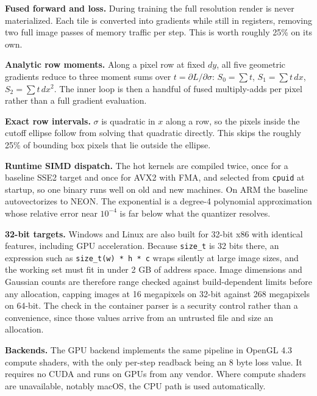\documentclass[11pt,a4paper]{article}
\begin{document}
\textbf{Fused forward and loss.} During training the full resolution render is never materialized. Each tile is converted into gradients while still in registers, removing two full image passes of memory traffic per step. This is worth roughly 25\% on its own.

\textbf{Analytic row moments.} Along a pixel row at fixed $dy$, all five geometric gradients reduce to three moment sums over $t = \partial L / \partial \sigma$: $S_0 = \sum t$, $S_1 = \sum t\,dx$, $S_2 = \sum t\,dx^2$. The inner loop is then a handful of fused multiply-adds per pixel rather than a full gradient evaluation.

\textbf{Exact row intervals.} $\sigma$ is quadratic in $x$ along a row, so the pixels inside the cutoff ellipse follow from solving that quadratic directly. This skips the roughly 25\% of bounding box pixels that lie outside the ellipse.

\textbf{Runtime SIMD dispatch.} The hot kernels are compiled twice, once for a baseline SSE2 target and once for AVX2 with FMA, and selected from \texttt{cpuid} at startup, so one binary runs well on old and new machines. On ARM the baseline autovectorizes to NEON. The exponential is a degree-4 polynomial approximation whose relative error near $10^{-4}$ is far below what the quantizer resolves.

\textbf{32-bit targets.} Windows and Linux are also built for 32-bit x86 with identical features, including GPU acceleration. Because \texttt{size\_t} is 32 bits there, an expression such as \texttt{size\_t(w) * h * c} wraps silently at large image sizes, and the working set must fit in under 2 GB of address space. Image dimensions and Gaussian counts are therefore range checked against build-dependent limits before any allocation, capping images at 16 megapixels on 32-bit against 268 megapixels on 64-bit. The check in the container parser is a security control rather than a convenience, since those values arrive from an untrusted file and size an allocation.

\textbf{Backends.} The GPU backend implements the same pipeline in OpenGL 4.3 compute shaders, with the only per-step readback being an 8 byte loss value. It requires no CUDA and runs on GPUs from any vendor. Where compute shaders are unavailable, notably macOS, the CPU path is used automatically.
\end{document}
